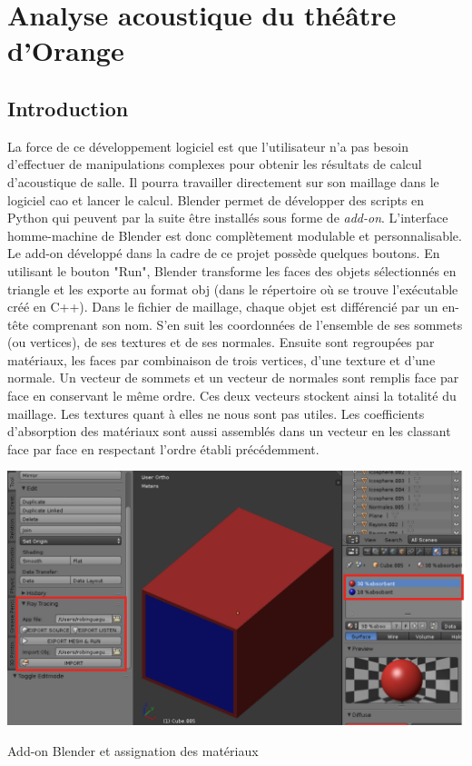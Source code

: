 \part{Analyse acoustique du théâtre d'Orange}
\label{part3}

\chapter*{Introduction}
	

La force de ce développement logiciel est que l'utilisateur n'a pas besoin d'effectuer de manipulations complexes pour obtenir les résultats de calcul d'acoustique de salle. Il pourra travailler directement sur son maillage dans le logiciel \gls{cao} et lancer le calcul. Blender permet de développer des scripts en Python qui peuvent par la suite être installés sous forme de \textit{add-on}. L'interface homme-machine de Blender est donc complètement modulable et personnalisable. Le add-on développé dans la cadre de ce projet possède quelques boutons. En utilisant le bouton "Run", Blender transforme les faces des objets sélectionnés en triangle et les exporte au format \gls{obj} (dans le répertoire où se trouve l'exécutable créé en C++). Dans le fichier de maillage, chaque objet est différencié par un en-tête comprenant son nom. S'en suit les coordonnées de l'ensemble de ses sommets (ou vertices), de ses textures et de ses normales. Ensuite sont regroupées par matériaux, les faces par combinaison de trois vertices, d'une texture et d'une normale. Un vecteur de sommets et un vecteur de normales sont remplis face par face en conservant le même ordre. Ces deux vecteurs stockent ainsi la totalité du maillage. Les textures quant à elles ne nous sont pas utiles. Les coefficients d'absorption des matériaux sont aussi assemblés dans un vecteur en les classant face par face en respectant l'ordre établi précédemment.

\begin{figureth}
	\includegraphics[width=\linewidth]{images/add-on}
	\caption{Add-on Blender et assignation des matériaux}
\end{figureth}

